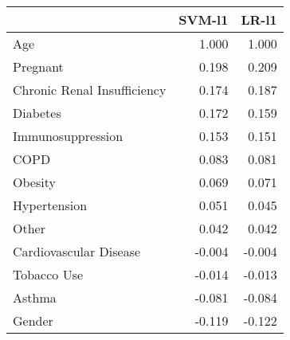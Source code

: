 \begin{tabular}{lrr}
\toprule
{} &  SVM-l1 &  LR-l1 \\
\midrule
Age                         &   1.000 &  1.000 \\
Pregnant                    &   0.198 &  0.209 \\
Chronic Renal Insufficiency &   0.174 &  0.187 \\
Diabetes                    &   0.172 &  0.159 \\
Immunosuppression           &   0.153 &  0.151 \\
COPD                        &   0.083 &  0.081 \\
Obesity                     &   0.069 &  0.071 \\
Hypertension                &   0.051 &  0.045 \\
Other                       &   0.042 &  0.042 \\
Cardiovascular Disease      &  -0.004 & -0.004 \\
Tobacco Use                 &  -0.014 & -0.013 \\
Asthma                      &  -0.081 & -0.084 \\
Gender                      &  -0.119 & -0.122 \\
\bottomrule
\end{tabular}

